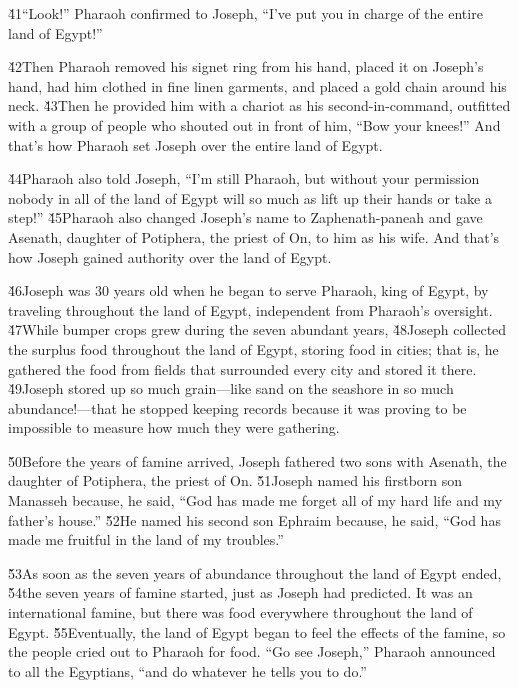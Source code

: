 \v{41}``Look!'' Pharaoh confirmed to Joseph, ``I've put you in charge of the entire land of Egypt!''

\v{42}Then Pharaoh removed his signet ring from his hand, placed it on Joseph's hand, had him clothed in fine linen garments, and placed a gold chain around his neck. \v{43}Then he provided him with a chariot as his second-in-command, outfitted with a group of people who shouted out in front of him, ``Bow your knees!'' And that's how Pharaoh set Joseph over the entire land of Egypt.

\v{44}Pharaoh also told Joseph, ``I'm still Pharaoh, but without your permission nobody in all of the land of Egypt will so much as lift up their hands or take a step!'' \v{45}Pharaoh also changed Joseph's name to Zaphenath-paneah and gave Asenath, daughter of Potiphera, the priest of On, to him as his wife. And that's how Joseph gained authority over the land of Egypt.

\v{46}Joseph was 30 years old when he began to serve Pharaoh, king of Egypt, by traveling throughout the land of Egypt, independent from Pharaoh's oversight. \v{47}While bumper crops grew during the seven abundant years, \v{48}Joseph collected the surplus food throughout the land of Egypt, storing food in cities; that is, he gathered the food from fields that surrounded every city and stored it there. \v{49}Joseph stored up so much grain---like sand on the seashore in so much abundance!---that he stopped keeping records because it was proving to be impossible to measure how much they were gathering.

\v{50}Before the years of famine arrived, Joseph fathered two sons with Asenath, the daughter of Potiphera, the priest of On. \v{51}Joseph named his firstborn son Manasseh because, he said, ``God has made me forget all of my hard life and my father's house.'' \v{52}He named his second son Ephraim because, he said, ``God has made me fruitful in the land of my troubles.''

\v{53}As soon as the seven years of abundance throughout the land of Egypt ended, \v{54}the seven years of famine started, just as Joseph had predicted. It was an international famine, but there was food everywhere throughout the land of Egypt. \v{55}Eventually, the land of Egypt began to feel the effects of the famine, so the people cried out to Pharaoh for food. ``Go see Joseph,'' Pharaoh announced to all the Egyptians, ``and do whatever he tells you to do.''

